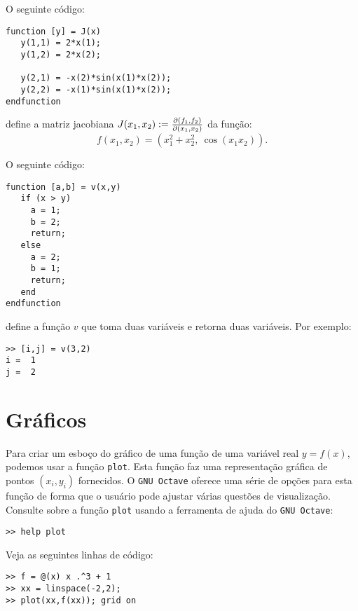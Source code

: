 \begin{ex}
  O seguinte código:
\begin{verbatim}
function [y] = J(x)
   y(1,1) = 2*x(1);
   y(1,2) = 2*x(2);

   y(2,1) = -x(2)*sin(x(1)*x(2));
   y(2,2) = -x(1)*sin(x(1)*x(2));
endfunction
\end{verbatim}
define a matriz jacobiana $J(x_1,x_2) := \frac{\partial(f_1,f_2)}{\partial(x_1,x_2)}$ da função:
\begin{equation*}
  f(x_1,x_2) = (x_1^2 + x_2^2,~\cos(x_1x_2)).
\end{equation*}
\end{ex}

\begin{ex}
  O seguinte código:
\begin{verbatim}
function [a,b] = v(x,y)
   if (x > y)
     a = 1;
     b = 2;
     return;
   else
     a = 2;
     b = 1;
     return;
   end
endfunction
\end{verbatim}
define a função $v$ que toma duas variáveis e retorna duas variáveis. Por exemplo:
\begin{verbatim}
>> [i,j] = v(3,2)
i =  1
j =  2
\end{verbatim}
\end{ex}

\section{Gráficos}

Para criar um esboço do gráfico de uma função de uma variável real $y = f(x)$, podemos usar a função \verb+plot+. Esta função faz uma representação gráfica de pontos $(x_i, y_i)$ fornecidos. O \verb+GNU Octave+ oferece uma série de opções para esta função de forma que o usuário pode ajustar várias questões de visualização. Consulte sobre a função \verb+plot+ usando a ferramenta de ajuda do \verb+GNU Octave+:
\begin{verbatim}
>> help plot
\end{verbatim}

\begin{ex}
  Veja as seguintes linhas de código:
\begin{verbatim}
>> f = @(x) x .^3 + 1
>> xx = linspace(-2,2);
>> plot(xx,f(xx)); grid on
\end{verbatim}
\end{ex}
